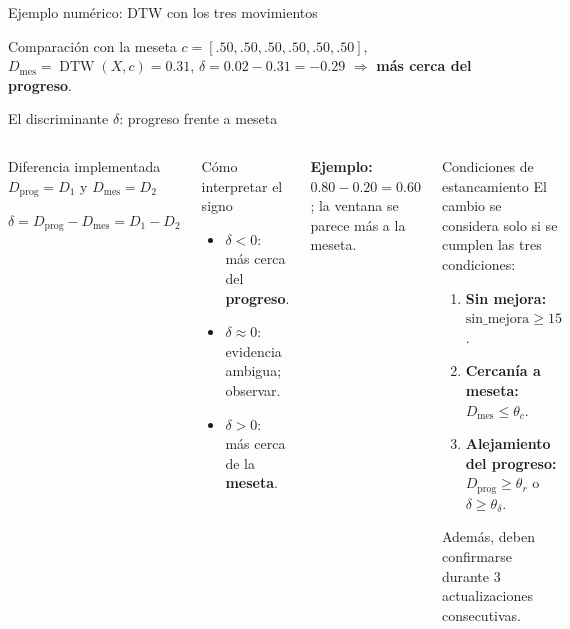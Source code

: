 \documentclass[aspectratio=169,11pt]{beamer}
\newcommand{\risk}[1]{\textcolor{warn}{\textbf{#1}}}
\newcommand{\good}[1]{\textcolor{best}{\textbf{#1}}}
\begin{document}
\begin{frame}{Ejemplo numérico: DTW con los tres movimientos}
  \begin{alertblock}{Comparación con la meseta}
    \centering
    $c=[.50,.50,.50,.50,.50,.50]$,\quad
    $D_{\mathrm{mes}}=\operatorname{DTW}(X,c)=0.31$,\quad
    $\delta=0.02-0.31=-0.29$
    $\Rightarrow$ \good{más cerca del progreso}.
  \end{alertblock}
\end{frame}

\begin{frame}{El discriminante $\delta$: progreso frente a meseta}
  \begin{columns}[T,onlytextwidth]
      \begin{block}{Diferencia implementada}
        \small
        \centering
        $D_{\mathrm{prog}}=D_1$ \quad y \quad $D_{\mathrm{mes}}=D_2$
        \vspace{0.08cm}

        $\boxed{\delta=D_{\mathrm{prog}}-D_{\mathrm{mes}}=D_1-D_2}$
      \end{block}

      \begin{block}{Cómo interpretar el signo}
        \footnotesize
        \begin{itemize}
          \item $\delta<0$: más cerca del \good{progreso}.
          \item $\delta\approx0$: evidencia ambigua; observar.
          \item $\delta>0$: más cerca de la \risk{meseta}.
        \end{itemize}
      \end{block}

      {\scriptsize\textbf{Ejemplo:} $0.80-0.20=0.60$; la ventana se parece más a la meseta.}

      \begin{alertblock}{Condiciones de estancamiento}
        \tiny
        El cambio se considera solo si se cumplen las tres condiciones:
        \begin{enumerate}
          \item \textbf{Sin mejora:} $\mathrm{sin\_mejora}\geq15$.
          \item \textbf{Cercanía a meseta:} $D_{\mathrm{mes}}\leq\theta_c$.
          \item \textbf{Alejamiento del progreso:} $D_{\mathrm{prog}}\geq\theta_r$
          o $\delta\geq\theta_\delta$.
        \end{enumerate}
        Además, deben confirmarse durante $3$ actualizaciones consecutivas.
      \end{alertblock}


\end{columns}
\end{frame}
\end{document}
